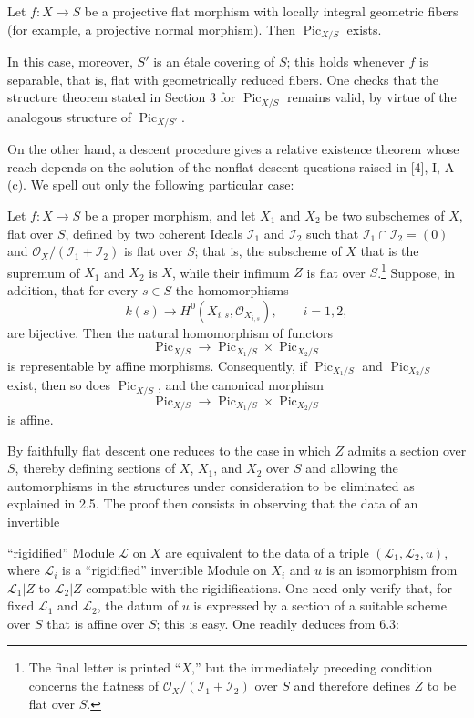  Let $f:X\longrightarrow S$ be a projective flat
morphism with locally integral geometric fibers (for example, a projective
normal morphism). Then $\operatorname{Pic}_{X/S}$ exists.

In this case, moreover, $S'$ is an étale covering of $S$; this holds whenever
$f$ is separable, that is, flat with geometrically reduced fibers. One checks
that the structure theorem stated in Section 3 for
$\operatorname{Pic}_{X/S}$ remains valid, by virtue of the analogous structure
of $\operatorname{Pic}_{X/S'}$.

On the other hand, a descent procedure gives a relative existence theorem
whose reach depends on the solution of the nonflat descent questions raised in
[4], I, A (c). We spell out only the following particular case:

 Let $f:X\longrightarrow S$ be a proper morphism,
and let $X_1$ and $X_2$ be two subschemes of $X$, flat over $S$, defined by two
coherent Ideals $\mathcal I_1$ and $\mathcal I_2$ such that
$\mathcal I_1\cap\mathcal I_2=(0)$ and
$\mathcal O_X/(\mathcal I_1+\mathcal I_2)$ is flat over $S$; that is, the
subscheme of $X$ that is the supremum of $X_1$ and $X_2$ is $X$, while their
infimum $Z$ is flat over $S$.\footnote{The final letter is printed “$X$,” but
the immediately preceding condition concerns the flatness of
$\mathcal O_X/(\mathcal I_1+\mathcal I_2)$ over $S$ and therefore defines $Z$
to be flat over $S$.} Suppose, in addition, that for every $s\in S$ the
homomorphisms
\[
k(s)\longrightarrow H^0(X_{i,s},\mathcal O_{X_{i,s}}),\qquad i=1,2,
\]
are bijective. Then the natural homomorphism of functors
\[
\operatorname{Pic}_{X/S}\longrightarrow
\operatorname{Pic}_{X_1/S}\times\operatorname{Pic}_{X_2/S}
\]
is representable by affine morphisms. Consequently, if
$\operatorname{Pic}_{X_1/S}$ and $\operatorname{Pic}_{X_2/S}$ exist, then so
does $\operatorname{Pic}_{X/S}$, and the canonical morphism
\[
\operatorname{Pic}_{X/S}\longrightarrow
\operatorname{Pic}_{X_1/S}\times\operatorname{Pic}_{X_2/S}
\]
is affine.

By faithfully flat descent one reduces to the case in which $Z$ admits a
section over $S$, thereby defining sections of $X$, $X_1$, and $X_2$ over $S$
and allowing the automorphisms in the structures under consideration to be
eliminated as explained in 2.5. The proof then consists in observing that the
data of an invertible

“rigidified” Module $\mathcal L$ on $X$ are equivalent to the data of a triple
$(\mathcal L_1,\mathcal L_2,u)$, where $\mathcal L_i$ is a “rigidified”
invertible Module on $X_i$ and $u$ is an isomorphism from
$\mathcal L_1|Z$ to $\mathcal L_2|Z$ compatible with the rigidifications. One
need only verify that, for fixed $\mathcal L_1$ and $\mathcal L_2$, the datum
of $u$ is expressed by a section of a suitable scheme over $S$ that is affine
over $S$; this is easy. One readily deduces from 6.3:

